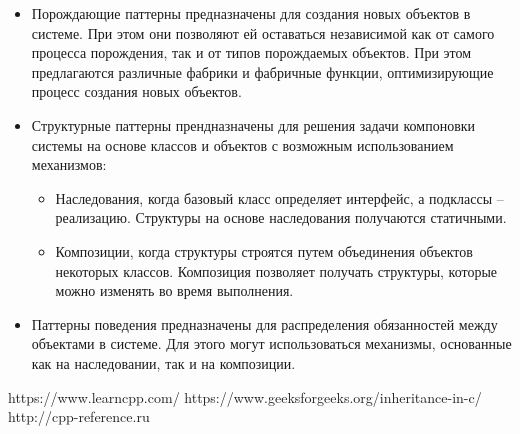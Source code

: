 \documentclass[a4paper,12pt]{article}	%
\begin{document}
	\begin{itemize}
	
		\item Порождающие паттерны предназначены для создания новых объектов в системе. При этом они позволяют ей оставаться независимой как от самого процесса порождения, так и от типов порождаемых объектов. При этом предлагаются различные фабрики и фабричные функции, оптимизирующие процесс создания новых объектов.
		
		\item Структурные паттерны прендназначены для решения задачи компоновки системы на основе классов и объектов с возможным использованием механизмов:
		
		\begin{itemize}
		
			\item Наследования, когда базовый класс определяет интерфейс, а подклассы -- реализацию. Структуры на основе наследования получаются статичными.
			
			\item Композиции, когда структуры строятся путем объединения объектов некоторых классов. Композиция позволяет получать структуры, которые можно изменять во время выполнения.	
			
		\end{itemize}
				
		\item Паттерны поведения предназначены для распределения обязанностей между объектами в системе. Для этого могут использоваться механизмы, основанные как на наследовании, так и на композиции.
	
	\end{itemize}

\newpage


 
	\begin{thebibliography}{}
    	 https://www.learncpp.com/
    	 https://www.geeksforgeeks.org/inheritance-in-c/
   		 http://cpp-reference.ru   
	\end{thebibliography}
\end{document}
